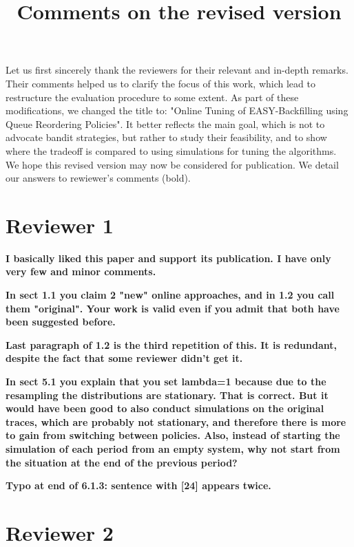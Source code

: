 \documentclass[]{article}
\title{Comments on the revised version}
\begin{document}
\maketitle

Let us first sincerely thank the reviewers for their relevant and in-depth
remarks. Their comments helped us to clarify the focus of this work, which
lead to restructure the evaluation procedure to some extent. As part of these
modifications, we changed the title to: "Online Tuning of EASY-Backfilling
using Queue Reordering Policies". It better reflects the main goal, which is
not to advocate bandit strategies, but rather to study their feasibility, and
to show where the tradeoff is compared to using simulations for tuning the
algorithms. We hope this revised version may now be considered for publication. 
We detail our answers to rewiewer's comments (bold).

\section{Reviewer 1}

\textbf{
  I basically liked this paper and support its publication.  I have only very few and minor comments.}

\textbf{In sect 1.1 you claim 2 "new" online approaches, and in 1.2 you call them "original". Your work is valid even if you
admit that both have been suggested before.
}

\textbf{Last paragraph of 1.2 is the third repetition of this.  It is redundant, despite the fact that some reviewer didn't get
it.
}

\textbf{In sect 5.1 you explain that you set lambda=1 because due to the resampling the distributions are stationary.  That is
correct.  But it would have been good to also conduct simulations on the original traces, which are probably not
stationary, and therefore there is more to gain from switching between policies.
Also, instead of starting the simulation of each period from an empty system, why not start from the situation at the
end of the previous period?
}

\textbf{Typo at end of 6.1.3: sentence with [24] appears twice.
}


\section{Reviewer 2}
\end{document}
